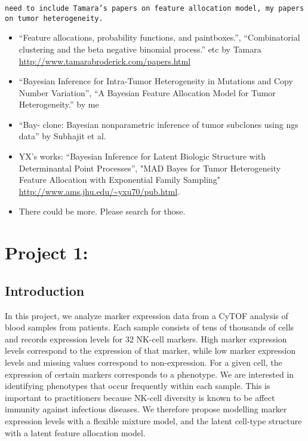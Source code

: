 \documentclass[12pt,]{article}
\begin{document}
{\tt need to include Tamara's papers on feature allocation model, my papers on tumor heterogeneity. 
\begin{itemize}
\item ``Feature allocations, probability functions, and paintboxes.'', ``Combinatorial clustering and the beta negative binomial process.'' etc by Tamara \url{http://www.tamarabroderick.com/papers.html}

\item ``Bayesian Inference for Intra-Tumor Heterogeneity in Mutations and Copy Number Variation'', ``A Bayesian Feature Allocation Model for Tumor Heterogeneity.'' by me

\item ``Bay- clone: Bayesian nonparametric inference of tumor subclones using ngs data'' by Subhajit et al.
 
\item YX's works: ``Bayesian Inference for Latent Biologic Structure with Determinantal Point Processes'', "MAD Bayes for Tumor Heterogeneity Feature Allocation with Exponential Family Sampling"  \url{http://www.ams.jhu.edu/~yxu70/pub.html}.

\item There could be more.  Please search for those.
\end{itemize}

}

\section{Project 1: }
\subsection{Introduction}
In this project, we analyze marker expression data from a CyTOF analysis of
blood samples from patients. Each sample consists of tens of thousands of cells
and records expression levels for 32 NK-cell markers. High marker expression
levels correspond to the expression of that marker, while low marker expression
levels and missing values correspond to non-expression. For a given cell, the
expression of certain markers corresponds to a phenotype. We are interested in
identifying phenotypes that occur frequently within each sample. This is
important to practitioners because NK-cell diversity is known to be affect
immunity against infectious diseases. We therefore propose modelling marker
expression levels with a flexible mixture model, and the latent cell-type
structure with a latent feature allocation model.
\end{document}

